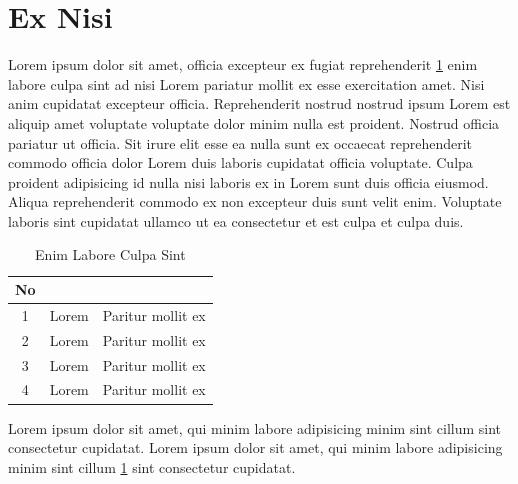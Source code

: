 \section{Ex Nisi}
Lorem ipsum dolor sit amet, officia excepteur ex fugiat reprehenderit \ref{tab:enimlaboreculpa} enim labore culpa sint ad nisi Lorem pariatur mollit ex esse exercitation amet. Nisi anim cupidatat excepteur officia. Reprehenderit nostrud nostrud ipsum Lorem est aliquip amet voluptate voluptate dolor minim nulla est proident. Nostrud officia pariatur ut officia. Sit irure elit esse ea nulla sunt ex occaecat reprehenderit commodo officia dolor Lorem duis laboris cupidatat officia voluptate. Culpa proident adipisicing id nulla nisi laboris ex in Lorem sunt duis officia eiusmod. Aliqua reprehenderit commodo ex non excepteur duis sunt velit enim. Voluptate laboris sint cupidatat ullamco ut ea consectetur et est culpa et culpa duis.

\begin{table}[H]
	\centering
	\caption{Enim Labore Culpa Sint}
	\label{tab:enimlaboreculpa}
	\begin{tabular}{|c|l|l|}
		\hline
		\rowcolor[HTML]{C0C0C0}
		{\color[HTML]{000000} \textbf{No}} & \multicolumn{1}{c|}{\cellcolor[HTML]{C0C0C0}{\color[HTML]{000000} \textbf{Labore}}} & \multicolumn{1}{c|}{\cellcolor[HTML]{C0C0C0}{\color[HTML]{000000} \textbf{Culpa}}} \\ \hline
		1                                  & Lorem                                                                             & Paritur mollit ex                                                                   \\ \hline
		2                                  & Lorem                                                                             & Paritur mollit ex                                                                   \\ \hline
		3                                  & Lorem                                                                             & Paritur mollit ex                                                                   \\ \hline
		4                                  & Lorem                                                                             & Paritur mollit ex                                                                   \\ \hline
	\end{tabular}
\end{table}

Lorem ipsum dolor sit amet, qui minim labore adipisicing minim sint cillum sint consectetur cupidatat. Lorem ipsum dolor sit amet, qui minim labore adipisicing minim sint cillum \ref{tab:enimlaboreculpa} sint consectetur cupidatat.
